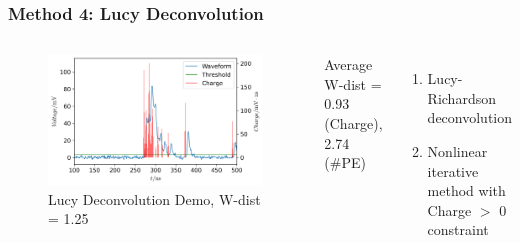 \documentclass{beamer}
\begin{document}
\begin{frame}
\frametitle{Method 4: Lucy Deconvolution}
\begin{columns}
\begin{figure}
    \centering
    \caption{Lucy Deconvolution Demo, W-dist = 1.25}
    \includegraphics[width=1.0\linewidth]{img/lucyddm.png}
\end{figure}
\vspace{-4mm}
\begin{center}
    Average W-dist = 0.93 (Charge), 2.74 (\#PE)
\end{center}
\begin{enumerate}
    \item Lucy-Richardson deconvolution
    \item Nonlinear iterative method with Charge $>$ 0 constraint
\end{enumerate}
\end{columns}
\end{frame}
\end{document}
